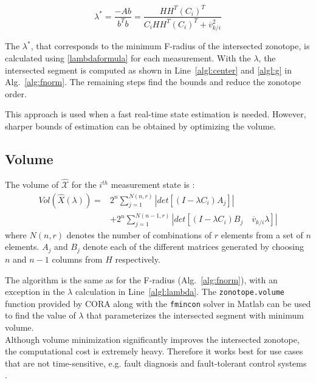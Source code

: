 \begin{equation}
\label{lambdaformula}
\lambda^* = \frac{-Ab }{b^Tb}  = \frac{HH^T(C_i)^T}{C_i HH^T(C_i)^T + \overline{v}_{k/i}^2} 
\end{equation}

The $\lambda^*$, that corresponds to the minimum F-radius of the intersected zonotope, is calculated using \eqref{lambdaformula} for each measurement. With the $\lambda$, the intersected segment is computed as shown in Line~\ref{algl:center} and \ref{algl:g} in Alg.~\ref{alg:fnorm}. The remaining steps find the bounds and reduce the zonotope order. 

This approach is used when a fast real-time state estimation is needed. However, sharper bounds of estimation can be obtained by optimizing the volume.

\subsection{Volume}
The volume of $\mathcal{\hat{X}}$ for the $i^{th}$ measurement state is \cite{Alamo2005}:
\begin{equation}
\label{volumeformula}
\begin{split}
Vol(\hat{X}(\lambda))=& 2^n \sum^{N(n,r)}_{j=1} |det[(I - \lambda C_i)A_j]|\\
&+ 2^n \sum^{N(n-1,r)}_{j=1} |det[(I- \lambda C_i)B_j\quad \overline{v}_{k/i}\lambda]|
\end{split}
\end{equation}
where $N(n,r)$ denotes the number of combinations of $r$ elements from a set of $n$ elements. $A_j$ and $B_j$ denote each of the different matrices generated by choosing $n$ and $n-1$ columns from $H$ respectively. 

The algorithm is the same as for the F-radius (Alg.~\ref{alg:fnorm}), with an exception in the $\lambda$ calculation in Line~\ref{algl:lambda}. The \texttt{zonotope.volume} function provided by CORA along with the \texttt{fmincon} solver in Matlab\textsuperscript{\tiny\textregistered}  can be used to find the value of $\lambda$ that parameterizes the intersected segment with minimum volume. \\
Although volume minimization significantly improves the intersected zonotope, the computational cost is extremely heavy. Therefore it works best for use cases that are not time-sensitive, e.g. fault diagnosis and fault-tolerant control systems \cite{Puig2010}. 

